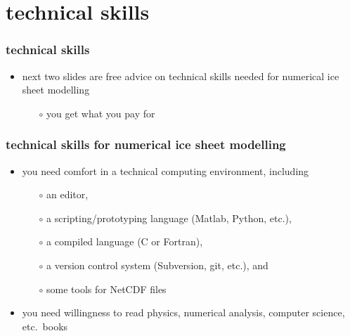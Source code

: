 
\section{technical skills}

\begin{frame}[fragile]
\frametitle{technical skills}

\begin{itemize}
\item next two slides are free advice on technical skills needed for numerical ice sheet modelling
  \begin{itemize}\small
  \item[$\circ$] you get what you pay for
  \normalsize
  \end{itemize}
\end{itemize}
\end{frame}


\begin{frame}
\frametitle{technical skills for numerical ice sheet modelling }

\begin{itemize}
\item you need comfort in a technical computing environment, including
  \begin{itemize}\small
  \item[$\circ$] an editor,
  \item[$\circ$] a scripting/prototyping language (Matlab, Python, etc.),
  \item[$\circ$] a compiled language (C or Fortran),
  \item[$\circ$] a version control system (Subversion, git, etc.), and
  \item[$\circ$] some tools for NetCDF files
  \normalsize
  \end{itemize}
\item you need willingness to read physics, numerical analysis, computer science, etc.~books
\end{itemize}
\end{frame}


